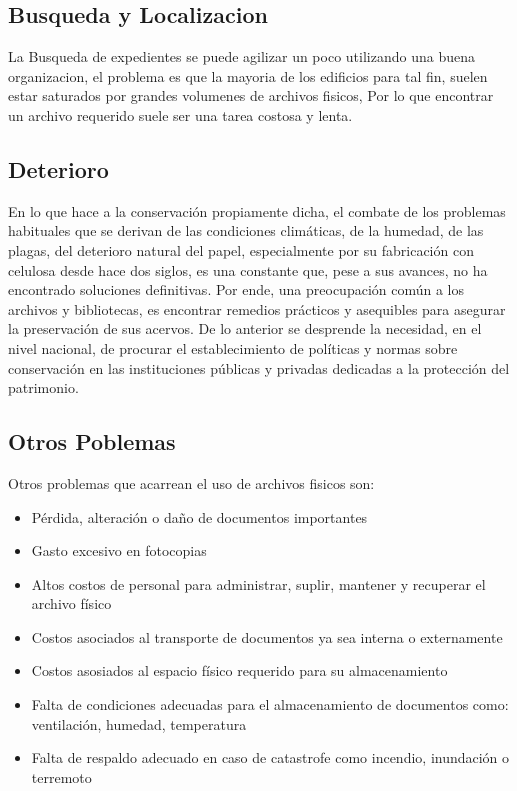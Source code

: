 \subsection{Busqueda y Localizacion}
La Busqueda de expedientes se puede agilizar un poco utilizando una buena organizacion,
el problema es que la mayoria de los edificios para tal fin, suelen estar saturados
por grandes volumenes de archivos fisicos, Por lo que encontrar un archivo requerido
suele ser una tarea costosa y lenta.\\[0.1cm]

\subsection{Deterioro}
En lo que hace a la conservación propiamente dicha, el combate de los
problemas habituales que se derivan de las condiciones climáticas, de la humedad,
de las plagas, del deterioro natural del papel, especialmente por su fabricación
con celulosa desde hace dos siglos, es una constante que, pese a sus avances,
no ha encontrado soluciones definitivas. Por ende, una preocupación común a los
archivos y bibliotecas, es encontrar remedios prácticos y asequibles para
asegurar la preservación de sus acervos. De lo anterior se desprende la
necesidad, en el nivel nacional, de procurar el establecimiento de políticas y
normas sobre conservación en las instituciones públicas y privadas dedicadas
a la protección del patrimonio.\\[0.1cm]

\subsection{Otros Poblemas}
Otros problemas que acarrean el uso de archivos fisicos son:

\begin{itemize}
    \item Pérdida, alteración o daño de documentos importantes
    \item Gasto excesivo en fotocopias
    \item Altos costos de personal para administrar, suplir, mantener y recuperar el archivo físico
    \item Costos asociados al transporte de documentos ya sea interna o externamente
    \item Costos asosiados al espacio físico requerido para su almacenamiento
    \item Falta de condiciones adecuadas para el almacenamiento de documentos como: ventilación, humedad, temperatura
    \item Falta de respaldo adecuado en caso de catastrofe como incendio, inundación o terremoto
\end{itemize}


